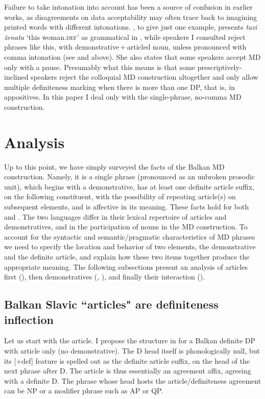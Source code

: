 \documentclass[output=paper]{langscibook}
\begin{document}
\noindent Failure to take intonation into account has been a source of confusion in earlier works, as disagreements on data acceptability may often trace back to imagining printed words with different intonations. \citet{Arnaudova1998}, to give just one example, presents \textit{tazi ženata} `this woman.\textsc{def}' as grammatical in , while speakers I consulted reject phrases like this, with demonstrative\,+\,articled noun,  unless pronounced with comma intonation (see  and  above). She also states that some speakers accept MD only with a pause. Presumably what this means is that some prescriptively-inclined speakers reject the colloquial MD construction altogether and only allow multiple definiteness marking when there is more than one DP, that is, in appositives. In this paper I deal only with the single-phrase, no-comma MD construction.

\section{Analysis}

Up to this point, we have simply surveyed the facts of the Balkan  MD construction. Namely, it is a single phrase (pronounced as an unbroken prosodic unit), which begins with a demonstrative, has at least one definite article suffix, on the following constituent, with the possibility of repeating article(s) on subsequent elements, and is affective in its meaning. These facts hold for both  and . The two languages differ in their lexical repertoire of articles and demonstratives, and in the participation of nouns in the MD construction. To account for the syntactic and semantic/pragmatic characteristics of MD phrases we need to specify the location and behavior of two elements, the demonstrative and the definite article, and explain how these two items together produce the appropriate meaning. The following subsections present an analysis of articles first (), then demonstratives (, ), and finally their interaction ().

\subsection{Balkan Slavic ``articles" are definiteness inflection} \label{article}
Let us start with the article. I propose the structure in  for a Balkan  definite DP with article only (no demonstrative). The D head itself is phonologically null, but its [+def] feature is spelled out as the definite article suffix, on the head of the next phrase after D. The article is thus essentially an agreement affix, agreeing with a definite D. The phrase whose head hosts the article/definiteness agreement can be NP or a modifier phrase such as AP or QP.
\end{document}
